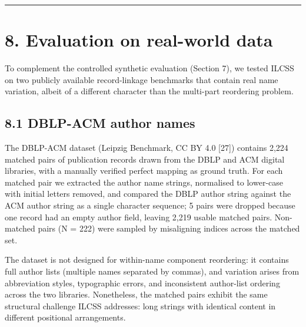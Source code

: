 \documentclass[
  11pt,
]{article}
\begin{document}
\begin{center}\rule{0.5\linewidth}{0.5pt}\end{center}

\section{8. Evaluation on real-world
data}\label{evaluation-on-real-world-data}

To complement the controlled synthetic evaluation (Section 7), we tested
ILCSS on two publicly available record-linkage benchmarks that contain
real name variation, albeit of a different character than the multi-part
reordering problem.

\subsection{8.1 DBLP-ACM author names}\label{dblp-acm-author-names}

The DBLP-ACM dataset (Leipzig Benchmark, CC BY 4.0 {[}27{]}) contains
2,224 matched pairs of publication records drawn from the DBLP and ACM
digital libraries, with a manually verified perfect mapping as ground
truth. For each matched pair we extracted the author name strings,
normalised to lower-case with initial letters removed, and compared the
DBLP author string against the ACM author string as a single character
sequence; 5 pairs were dropped because one record had an empty author
field, leaving 2,219 usable matched pairs. Non-matched pairs (N = 222)
were sampled by misaligning indices across the matched set.

The dataset is not designed for within-name component reordering: it
contains full author lists (multiple names separated by commas), and
variation arises from abbreviation styles, typographic errors, and
inconsistent author-list ordering across the two libraries. Nonetheless,
the matched pairs exhibit the same structural challenge ILCSS addresses:
long strings with identical content in different positional
arrangements.
\end{document}

